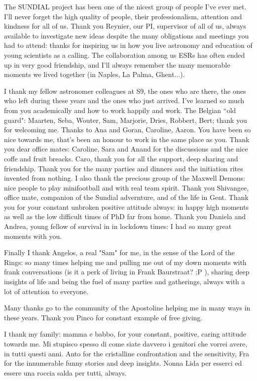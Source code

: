 The SUNDIAL project has been one of the nicest group of people I've ever met. I'll never forget the high quality of people, their professionalism, attention and kindness for all of us.
Thank you Reynier, our PI, supervisor of all of us, always available to investigate new ideas despite the many obligations and meetings you had to attend: thanks for inspiring us in how you live astronomy and education of young scientists as a calling.
The collaboration among us ESRs has often ended up in very good friendship, and I'll always remember the many memorable moments we lived together (in Naples, La Palma, Ghent...).

I thank my fellow astronomer colleagues at S9, the ones who are there, the ones who left during these years and the ones who just arrived. I've learned so much from you academically and how to work happily and work.
The Belgian ``old guard": Maarten, Seba, Wouter, Sam, Marjorie, Dries, Robbert, Bert; thank you for welcoming me. Thanks to Ana and Goran, Caroline, Aaron.
You have been so nice towards me, that's been an honour to work in the same place as you.
Thank you dear office mates: Caroline, Sara and Anand for the discussions and the nice coffe and fruit breacks. Caro, thank you for all the support, deep sharing and friendship.
Thank you for the many parties and dinners and the initiation rites invented from nothing.
I also thank the precious group of the Maxwell Demons: nice people to play minifootball and with real team spirit.
Thank you Shivangee, office mate, companion of the Sundial advernture, and of the life in Gent. Thank you for your constant unbroken positive attitude always: in happy high moments as well as the low difficult times of PhD far from home.
Thank you Daniela and Andrea, young fellow of survival in in lockdown times: I had so many great moments with you.

Finally I thank Angelos, a real "Sam" for me, in the sense of the Lord of the Rings: so many times helping me and pulling me out of my down moments with frank conversations (is it a perk of living in Frank Baurstraat? ;P ), sharing deep insights of life and being the fuel of many parties and gatherings, always with a lot of attention to everyone.

Many thanks go to the community of the Apostoline helping me in many ways in these years.
Thank you Pinco for constant example of free giving.

I thank my family: mamma e babbo, for your constant, positive, caring attitude towards me. Mi stupisco spesso di come siate davvero i genitori che vorrei avere, in tutti questi anni.
Anto for the cristalline confrontation and the sensitivity, Fra for the innumerable funny stories and deep insights. Nonna Lida per esserci ed essere una roccia salda per tutti, always.

